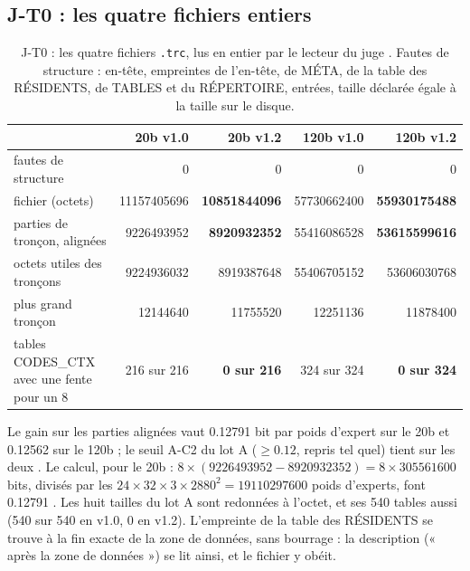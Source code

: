 \subsection{J-T0 : les quatre fichiers entiers}\label{t3jug:sec:jt0}

\begin{table}[ht]
\centering\footnotesize
\caption[J-T0 : les quatre fichiers, par le lecteur du juge]{J-T0 : les quatre fichiers \texttt{.trc}, lus en entier par le lecteur du juge \mes. Fautes de structure : en-tête, empreintes de l'en-tête, de MÉTA, de la table des RÉSIDENTS, de TABLES et du RÉPERTOIRE, entrées, taille déclarée égale à la taille sur le disque.}
\label{t3jug:tab:jt0}
\begin{tabular}{@{}lrrrr@{}}
\toprule
& 20b v1.0 & 20b v1.2 & 120b v1.0 & 120b v1.2 \\
\midrule
fautes de structure & 0 & 0 & 0 & 0 \\
fichier (octets) & \num{11157405696} & \textbf{\num{10851844096}} & \num{57730662400} & \textbf{\num{55930175488}} \\
parties de tronçon, alignées & \num{9226493952} & \textbf{\num{8920932352}} & \num{55416086528} & \textbf{\num{53615599616}} \\
octets utiles des tronçons & \num{9224936032} & \num{8919387648} & \num{55406705152} & \num{53606030768} \\
plus grand tronçon & \num{12144640} & \num{11755520} & \num{12251136} & \num{11878400} \\
tables CODES\_CTX avec une fente pour un 8 & 216 sur 216 & \textbf{0 sur 216} & 324 sur 324 & \textbf{0 sur 324} \\
\bottomrule
\end{tabular}
\end{table}

Le gain sur les parties alignées vaut \num{0.12791} bit par poids d'expert sur le 20b et \num{0.12562} sur le 120b ; le seuil A-C2 du lot A ($\ge \num{0.12}$, repris tel quel) tient sur les deux \mes. Le calcul, pour le 20b : $8 \times (\num{9226493952} - \num{8920932352}) = 8 \times \num{305561600}$ bits, divisés par les $24 \times 32 \times 3 \times \num{2880}^2 = \num{19110297600}$ poids d'experts, font \num{0.12791} \calc. Les huit tailles du lot A sont redonnées à l'octet, et ses 540 tables aussi (540 sur 540 en v1.0, 0 en v1.2). L'empreinte de la table des RÉSIDENTS se trouve à la fin exacte de la zone de données, sans bourrage : la description (« après la zone de données ») se lit ainsi, et le fichier y obéit.

